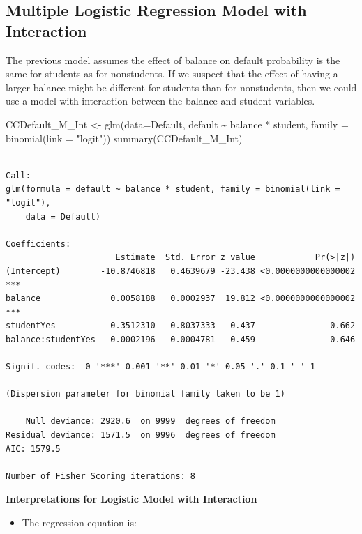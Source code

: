 \documentclass[
  letterpaper,
  DIV=11,
  numbers=noendperiod]{scrreprt}
\newenvironment{Shaded}{\begin{snugshade}}{\end{snugshade}}
\newcommand{\AttributeTok}[1]{\textcolor[rgb]{0.40,0.45,0.13}{#1}}
\newcommand{\FunctionTok}[1]{\textcolor[rgb]{0.28,0.35,0.67}{#1}}
\newcommand{\NormalTok}[1]{\textcolor[rgb]{0.00,0.23,0.31}{#1}}
\newcommand{\OtherTok}[1]{\textcolor[rgb]{0.00,0.23,0.31}{#1}}
\newcommand{\SpecialCharTok}[1]{\textcolor[rgb]{0.37,0.37,0.37}{#1}}
\newcommand{\StringTok}[1]{\textcolor[rgb]{0.13,0.47,0.30}{#1}}
\providecommand{\tightlist}{%
  \setlength{\itemsep}{0pt}\setlength{\parskip}{0pt}}\usepackage{longtable,booktabs,array}
\begin{document}
\subsection{Multiple Logistic Regression Model with
Interaction}\label{multiple-logistic-regression-model-with-interaction}

The previous model assumes the effect of balance on default probability
is the same for students as for nonstudents. If we suspect that the
effect of having a larger balance might be different for students than
for nonstudents, then we could use a model with interaction between the
balance and student variables.

\begin{Shaded}
\begin{Highlighting}[]
\NormalTok{CCDefault\_M\_Int }\OtherTok{\textless{}{-}} \FunctionTok{glm}\NormalTok{(}\AttributeTok{data=}\NormalTok{Default, default }\SpecialCharTok{\textasciitilde{}}\NormalTok{ balance }\SpecialCharTok{*}\NormalTok{ student, }\AttributeTok{family =} \FunctionTok{binomial}\NormalTok{(}\AttributeTok{link =} \StringTok{"logit"}\NormalTok{))}
\FunctionTok{summary}\NormalTok{(CCDefault\_M\_Int)}
\end{Highlighting}
\end{Shaded}

\begin{verbatim}

Call:
glm(formula = default ~ balance * student, family = binomial(link = "logit"), 
    data = Default)

Coefficients:
                      Estimate  Std. Error z value            Pr(>|z|)    
(Intercept)        -10.8746818   0.4639679 -23.438 <0.0000000000000002 ***
balance              0.0058188   0.0002937  19.812 <0.0000000000000002 ***
studentYes          -0.3512310   0.8037333  -0.437               0.662    
balance:studentYes  -0.0002196   0.0004781  -0.459               0.646    
---
Signif. codes:  0 '***' 0.001 '**' 0.01 '*' 0.05 '.' 0.1 ' ' 1

(Dispersion parameter for binomial family taken to be 1)

    Null deviance: 2920.6  on 9999  degrees of freedom
Residual deviance: 1571.5  on 9996  degrees of freedom
AIC: 1579.5

Number of Fisher Scoring iterations: 8
\end{verbatim}

\textbf{Interpretations for Logistic Model with Interaction}

\begin{itemize}
\tightlist
\item
  The regression equation is:
\end{itemize}
\end{document}
